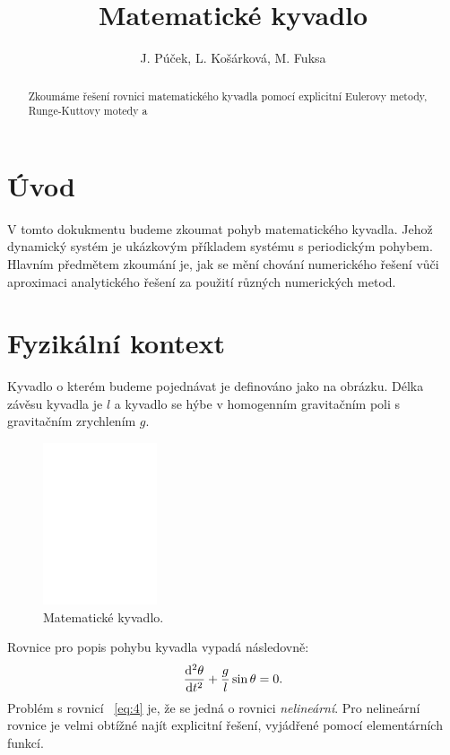 \documentclass[reqno, a4paper]{amsart}
\author{J. Púček, L. Košárková, M. Fuksa}
\title{Matematické kyvadlo}
\begin{document}
\begin{abstract}
	Zkoumáme řešení rovnici matematického kyvadla pomocí explicitní Eulerovy metody, Runge-Kuttovy motedy a
\end{abstract}

\maketitle

\tableofcontents

\section{Úvod}
\label{sec:Úvod}

V tomto dokukmentu budeme zkoumat pohyb matematického kyvadla. Jehož dynamický systém je ukázkovým příkladem systému s periodickým pohybem. Hlavním předmětem zkoumání je, jak se mění chování numerického řešení vůči aproximaci analytického řešení za použití různých numerických metod.

\section{Fyzikální kontext}
\label{sec:Fyzikální kontext}
Kyvadlo o kterém budeme pojednávat je definováno jako na obrázku. Délka závěsu kyvadla je $l$ a kyvadlo se hýbe v homogenním gravitačním poli s gravitačním zrychlením $g$.

\begin{figure}[h]
\centering
\includegraphics[width=0.3\textwidth]{pendulum-intro}
\caption*{Matematické kyvadlo.}  
\label{fig:pendulum-intro}
\end{figure}

Rovnice pro popis pohybu kyvadla vypadá následovně:
\begin{equation}
  \label{eq:4}
  \frac{\mathrm{d}^2 {\theta}}{\mathrm{d} {t}^2} + \frac{g}{l} \sin \theta = 0.
\end{equation}
Problém s rovnicí ~\eqref{eq:4} je, že se jedná o rovnici \emph{nelineární}. Pro nelineární rovnice je velmi obtížné najít explicitní řešení, vyjádřené pomocí elementárních funkcí.
\end{document}

